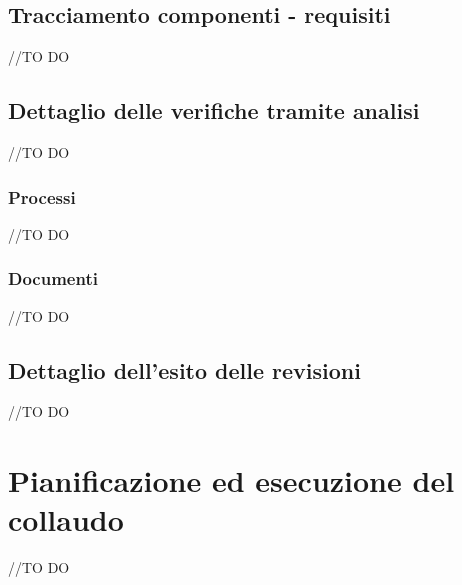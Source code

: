 \documentclass[12pt,a4paper]{article}
\begin{document}
\subsection{Tracciamento componenti - requisiti}
//TO DO \IB
\subsection{Dettaglio delle verifiche tramite analisi}
//TO DO \IB
\subsubsection{Processi}
//TO DO \IB
\subsubsection{Documenti}
//TO DO \IB
\subsection{Dettaglio dell'esito delle revisioni}
//TO DO \IB 
\newpage
\section{Pianificazione ed esecuzione del collaudo}
//TO DO \IB 
\end{document}
